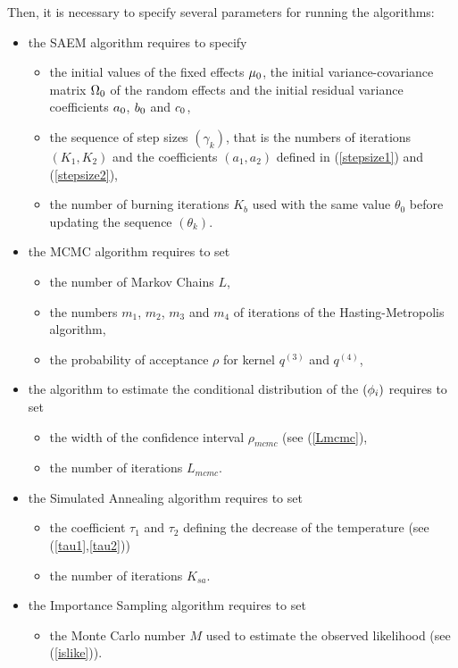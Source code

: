 Then, it is necessary to specify several parameters for running the algorithms:
\begin{itemize}
\item the SAEM algorithm requires to specify
\begin{itemize}
\item the initial values of the fixed effects $\fixed_effect_0$, the initial variance-covariance matrix ${\Omega}_0$ of the
random effects and the initial residual variance coefficients $a_0$, $b_0$ and $c_0$,
\item the sequence of step sizes $(\gamma_k)$, that is the numbers of iterations $(K_1,K_2)$ and the coefficients
  $(a_1,a_2)$ defined in (\ref{stepsize1}) and (\ref{stepsize2}),
\item the number of burning iterations $K_b$ used with the same value $\theta_0$ before updating the sequence $(\theta_k)$.
\end{itemize}
\item the MCMC algorithm requires to set
\begin{itemize}
\item the number of Markov Chains $L$,
\item the numbers $m_1$, $m_2$, $m_3$ and $m_4$ of iterations of the Hasting-Metropolis algorithm,
\item the probability of acceptance $\rho$ for  kernel $q^{(3)}$ and $q^{(4)}$,
\end{itemize}
\item the algorithm to estimate the conditional distribution of the $({\phi}_i)$ requires to set
\begin{itemize}
\item the width of the confidence interval $\rho_{mcmc}$ (see (\ref{Lmcmc}),
\item the number of iterations $L_{mcmc}$.
\end{itemize}
\item the Simulated Annealing algorithm requires to set
\begin{itemize}
\item the coefficient $\tau_1$ and $\tau_2$ defining the decrease of the temperature (see (\ref{tau1},\ref{tau2}))
\item the number of iterations $K_{sa}$.
\end{itemize}
\item the Importance Sampling algorithm requires to set
\begin{itemize}
\item the Monte Carlo number $M$ used to estimate the observed likelihood (see (\ref{islike})).
\end{itemize}
\end{itemize}

